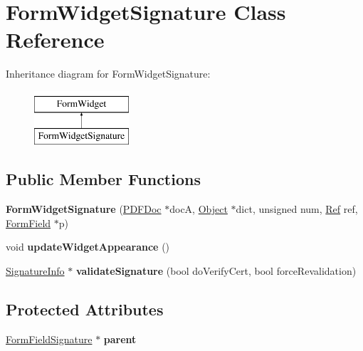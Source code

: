\hypertarget{class_form_widget_signature}{}\section{Form\+Widget\+Signature Class Reference}
\label{class_form_widget_signature}
Inheritance diagram for Form\+Widget\+Signature\+:\begin{figure}[H]
\begin{center}
\leavevmode
\includegraphics[height=2.000000cm]{class_form_widget_signature}
\end{center}
\end{figure}
\subsection*{Public Member Functions}
\begin{DoxyCompactItemize}
\item 
\mbox{\label{class_form_widget_signature_afece54566bbaa449653da1b0c6ec7385}} 
{\bfseries Form\+Widget\+Signature} (\hyperlink{class_p_d_f_doc}{P\+D\+F\+Doc} $\ast$docA, \hyperlink{class_object}{Object} $\ast$dict, unsigned num, \hyperlink{struct_ref}{Ref} ref, \hyperlink{class_form_field}{Form\+Field} $\ast$p)
\item 
\mbox{\label{class_form_widget_signature_af545c7c42d02509c95eb9f9134a57bc9}} 
void {\bfseries update\+Widget\+Appearance} ()
\item 
\mbox{\label{class_form_widget_signature_a604192d5be4202a4971e6b00e26b74ee}} 
\hyperlink{class_signature_info}{Signature\+Info} $\ast$ {\bfseries validate\+Signature} (bool do\+Verify\+Cert, bool force\+Revalidation)
\end{DoxyCompactItemize}
\subsection*{Protected Attributes}
\begin{DoxyCompactItemize}
\item 
\mbox{\label{class_form_widget_signature_a36ccf2305ba3993a734042683d6e7f51}} 
\hyperlink{class_form_field_signature}{Form\+Field\+Signature} $\ast$ {\bfseries parent}
\end{DoxyCompactItemize}
